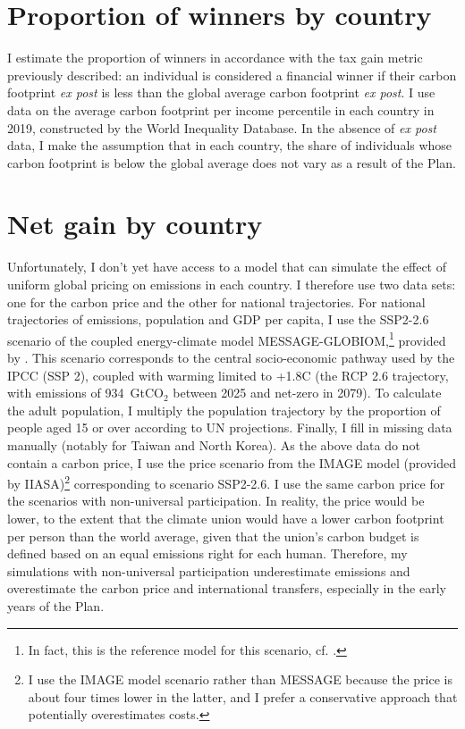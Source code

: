 \documentclass[a5paper,english,openany]{memoir}
\begin{document}
\section{Proportion of winners by country}

I estimate the proportion of winners in accordance with the tax gain metric previously described: an individual is considered a financial winner if their %
carbon footprint \textit{ex post} is less than the global average carbon footprint \textit{ex post}. I use data on the average carbon footprint per income percentile in each country in 2019, constructed by the World Inequality Database. In the absence of \textit{ex post} data, I make the assumption that in each country, the share of individuals whose carbon footprint is below the global average does not vary as a result of the Plan.

\section{Net gain by country}\label{app:pays} 

Unfortunately, I don't yet have access to a model that can simulate the effect of uniform global pricing on emissions in each country. I therefore use two data sets: one for the carbon price and the other for national trajectories. For national trajectories of emissions, population and GDP per capita, I use the SSP2-2.6 scenario of the coupled energy-climate model MESSAGE-GLOBIOM,\footnote{In fact, this is the reference model for this scenario, cf. \cite{fricko_marker_2017}.} provided by \cite{gutschow_country-resolved_2021}. This scenario corresponds to the central socio-economic pathway used by the IPCC (SSP 2), coupled with warming limited to +1.8\textdegree{}C (the RCP 2.6 trajectory, with emissions of 934~GtCO$_\text{2}$ between 2025 and net-zero in 2079). To calculate the adult population, I multiply the population trajectory by the proportion of people aged 15 or over according to UN projections. Finally, I fill in missing data manually (notably for Taiwan and North Korea). As the above data do not contain a carbon price, I use the price scenario from the IMAGE model (provided by IIASA)\footnote{I use the IMAGE model scenario rather than MESSAGE because the price is about four times lower in the latter, and I prefer a conservative approach that potentially overestimates costs. 
} corresponding to scenario SSP2-2.6. I use the same carbon price for the scenarios with non-universal participation. In reality, the price would be lower, to the extent that the climate union would have a lower carbon footprint per person than the world average, given that the union's carbon budget is defined based on an equal emissions right for each human. Therefore, my simulations with non-universal participation underestimate emissions and overestimate the carbon price and international transfers, especially in the early years of the Plan.
\end{document}
